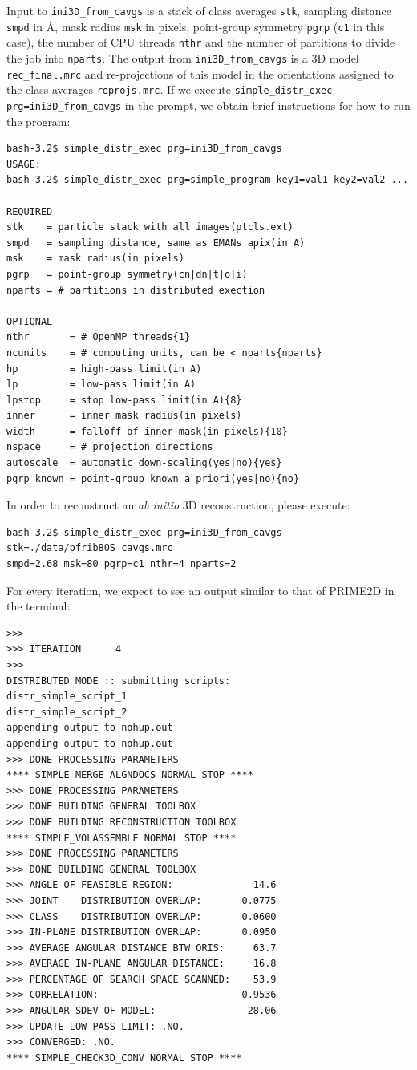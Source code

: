 \documentclass[a4paper,11pt]{article}
\newcommand{\prgname}[1]{\textcolor{NavyBlue}{\texttt{#1}}}
\begin{document}
Input to \prgname{ini3D\_from\_cavgs} is a stack of class averages \texttt{stk}, sampling distance \texttt{smpd} in \AA{}, mask radius \texttt{msk} in pixels, point-group symmetry \texttt{pgrp} (\texttt{c1} in this case), the number of CPU threads \texttt{nthr} and the number of partitions to divide the job into \texttt{nparts}. The output from \prgname{ini3D\_from\_cavgs} is a 3D model \texttt{rec\_final.mrc} and re-projections of this model in the orientations assigned to the class averages \texttt{reprojs.mrc}. If we execute \texttt{simple\_distr\_exec prg=ini3D\_from\_cavgs} in the prompt, we obtain brief instructions for how to run the program:
\begin{verbatim}
bash-3.2$ simple_distr_exec prg=ini3D_from_cavgs
USAGE:
bash-3.2$ simple_distr_exec prg=simple_program key1=val1 key2=val2 ...

REQUIRED
stk    = particle stack with all images(ptcls.ext)
smpd   = sampling distance, same as EMANs apix(in A)
msk    = mask radius(in pixels)
pgrp   = point-group symmetry(cn|dn|t|o|i)
nparts = # partitions in distributed exection

OPTIONAL
nthr       = # OpenMP threads{1}
ncunits    = # computing units, can be < nparts{nparts}
hp         = high-pass limit(in A)
lp         = low-pass limit(in A)
lpstop     = stop low-pass limit(in A){8}
inner      = inner mask radius(in pixels)
width      = falloff of inner mask(in pixels){10}
nspace     = # projection directions
autoscale  = automatic down-scaling(yes|no){yes}
pgrp_known = point-group known a priori(yes|no){no}\end{verbatim}
In order to reconstruct an \textit{ab initio} 3D reconstruction, please execute:
\begin{verbatim}
bash-3.2$ simple_distr_exec prg=ini3D_from_cavgs stk=./data/pfrib80S_cavgs.mrc
smpd=2.68 msk=80 pgrp=c1 nthr=4 nparts=2
\end{verbatim}
For every iteration, we expect to see an output similar to that of PRIME2D in the terminal:
\begin{verbatim}
>>>
>>> ITERATION      4
>>>
DISTRIBUTED MODE :: submitting scripts:
distr_simple_script_1
distr_simple_script_2
appending output to nohup.out
appending output to nohup.out
>>> DONE PROCESSING PARAMETERS
**** SIMPLE_MERGE_ALGNDOCS NORMAL STOP ****
>>> DONE PROCESSING PARAMETERS
>>> DONE BUILDING GENERAL TOOLBOX
>>> DONE BUILDING RECONSTRUCTION TOOLBOX
**** SIMPLE_VOLASSEMBLE NORMAL STOP ****
>>> DONE PROCESSING PARAMETERS
>>> DONE BUILDING GENERAL TOOLBOX
>>> ANGLE OF FEASIBLE REGION:              14.6
>>> JOINT    DISTRIBUTION OVERLAP:       0.0775
>>> CLASS    DISTRIBUTION OVERLAP:       0.0600
>>> IN-PLANE DISTRIBUTION OVERLAP:       0.0950
>>> AVERAGE ANGULAR DISTANCE BTW ORIS:     63.7
>>> AVERAGE IN-PLANE ANGULAR DISTANCE:     16.8
>>> PERCENTAGE OF SEARCH SPACE SCANNED:    53.9
>>> CORRELATION:                         0.9536
>>> ANGULAR SDEV OF MODEL:                28.06
>>> UPDATE LOW-PASS LIMIT: .NO.
>>> CONVERGED: .NO.
**** SIMPLE_CHECK3D_CONV NORMAL STOP ****
\end{verbatim}
\end{document}
